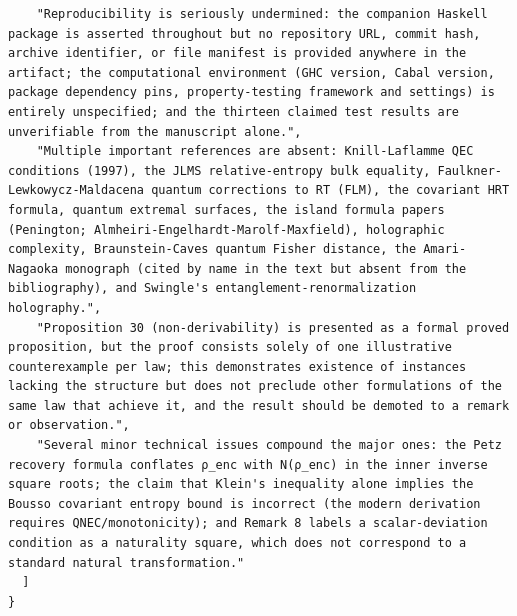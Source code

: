 \documentclass[11pt]{article}
\begin{document}
\begin{verbatim}
    "Reproducibility is seriously undermined: the companion Haskell package is asserted throughout but no repository URL, commit hash, archive identifier, or file manifest is provided anywhere in the artifact; the computational environment (GHC version, Cabal version, package dependency pins, property-testing framework and settings) is entirely unspecified; and the thirteen claimed test results are unverifiable from the manuscript alone.",
    "Multiple important references are absent: Knill-Laflamme QEC conditions (1997), the JLMS relative-entropy bulk equality, Faulkner-Lewkowycz-Maldacena quantum corrections to RT (FLM), the covariant HRT formula, quantum extremal surfaces, the island formula papers (Penington; Almheiri-Engelhardt-Marolf-Maxfield), holographic complexity, Braunstein-Caves quantum Fisher distance, the Amari-Nagaoka monograph (cited by name in the text but absent from the bibliography), and Swingle's entanglement-renormalization holography.",
    "Proposition 30 (non-derivability) is presented as a formal proved proposition, but the proof consists solely of one illustrative counterexample per law; this demonstrates existence of instances lacking the structure but does not preclude other formulations of the same law that achieve it, and the result should be demoted to a remark or observation.",
    "Several minor technical issues compound the major ones: the Petz recovery formula conflates ρ_enc with N(ρ_enc) in the inner inverse square roots; the claim that Klein's inequality alone implies the Bousso covariant entropy bound is incorrect (the modern derivation requires QNEC/monotonicity); and Remark 8 labels a scalar-deviation condition as a naturality square, which does not correspond to a standard natural transformation."
  ]
}
\end{verbatim}
\end{document}
